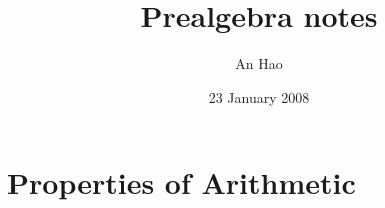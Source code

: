 \documentclass[12pt,a4paper]{book}
\title{
	{Prealgebra notes}\\
}
\author{An Hao}
\date{23 January 2008}
\begin{document}
\maketitle

\tableofcontents

\chapter{Properties of Arithmetic}

\end{document}
